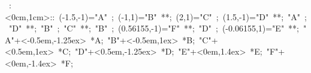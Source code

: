 

\hbox{
\xy    <1cm,0cm>:<0cm,1cm>::
       (-1.5,-1)="A" ; (-1,1)="B" **\dir{-};
       (2,1)="C" ; (1.5,-1)="D" **\dir{-};
       "A" ; "D" **\dir{-};
       "B" ; "C" **\dir{-};
       "B" ; (0.56155,-1)="F" **\dir{-};
       "D" ; (-0.06155,1)="E" **\dir{-};
       "A"+<-0.5em,-1.25ex> *{A}; 
       "B"+<-0.5em,1ex> *{B}; 
       "C"+<0.5em,1ex> *{C}; 
       "D"+<0.5em,-1.25ex> *{D}; 
       "E"+<0em,1.4ex> *{E}; 
       "F"+<0em,-1.4ex> *{F}; 
\endxy}
